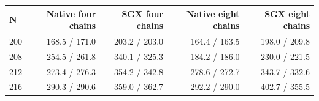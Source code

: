 \begin{tabular}{lrrrr}
\toprule
N & Native four chains & SGX four chains & Native eight chains & SGX eight chains \\
\midrule
200 & 168.5 / 171.0 & 203.2 / 203.0 & 164.4 / 163.5 & 198.0 / 209.8 \\
208 & 254.5 / 261.8 & 340.1 / 325.3 & 184.2 / 186.0 & 230.0 / 221.5 \\
212 & 273.4 / 276.3 & 354.2 / 342.8 & 278.6 / 272.7 & 343.7 / 332.6 \\
216 & 290.3 / 290.6 & 359.0 / 362.7 & 292.2 / 290.0 & 402.7 / 355.5 \\
\bottomrule
\end{tabular}
